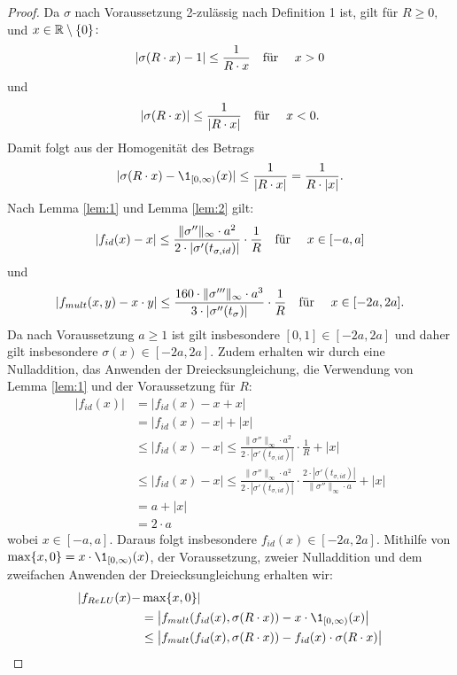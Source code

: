   \begin{proof}
  Da $\sigma$ nach Voraussetzung 2-zulässig nach Definition 1 ist, gilt für $R \geq 0,$ und $x \in \mathbb{R}\setminus\{0\}\colon$ $$|\sigma(R \cdot x) - 1| \leq \frac{1}{R\cdot x} \text{\quad für \quad} x > 0$$ und $$|\sigma(R \cdot x)| \leq \frac{1}{|R \cdot x|} \text{\quad für \quad} x < 0.$$
Damit folgt aus der Homogenität des Betrags $$|\sigma(R \cdot x) - \1_{[0, \infty)}(x)| \leq \frac{1}{|R \cdot x|} = \frac{1}{R \cdot |x|}.$$ 
Nach Lemma \ref{lem:1} und Lemma \ref{lem:2} gilt$\colon$
$$ |f_{id}(x) - x| \leq \frac{\|\sigma''\|_{\infty} \cdot a^2}{2 \cdot |\sigma'(t_{\sigma, id})|} \cdot \frac{1}{R} \text{\quad für \quad} x \in [-a, a]$$ und 
$$ |f_{mult}(x, y) - x \cdot y| \leq \frac{160 \cdot \|\sigma'''\|_{\infty} \cdot a ^3}{3 \cdot |\sigma''(t_{\sigma})|} \cdot \frac{1}{R} \text{\quad für \quad} x \in [-2a, 2a].$$ 
Da nach Voraussetzung $a \geq 1$ ist gilt insbesondere $[0, 1] \in [-2a, 2a]$ und daher gilt insbesondere $\sigma(x) \in [-2a, 2a].$ 
Zudem erhalten wir durch eine Nulladdition, das Anwenden der Dreiecksungleichung, die Verwendung von Lemma \ref{lem:1} und der Voraussetzung für $R\colon$
\begin{equation*}
\begin{split}
|f_{id}(x)| & = |f_{id}(x) - x + x| \\
& = |f_{id}(x) -x| + |x| \\
& \leq |f_{id}(x) - x| \leq \frac{\|\sigma''\|_{\infty} \cdot a^2}{2 \cdot |\sigma'(t_{\sigma, id})|} \cdot \frac{1}{R} + |x| \\
& \leq |f_{id}(x) - x| \leq \frac{\|\sigma''\|_{\infty} \cdot a^2}{2 \cdot |\sigma'(t_{\sigma, id})|} \cdot \frac{2 \cdot |\sigma'(t_{\sigma, id})|}{\|\sigma''\|_{\infty} \cdot a} + |x| \\
& = a + |x| \\
& = 2 \cdot a
\end{split}
\end{equation*}
wobei $x \in [-a, a]$. Daraus folgt insbesondere $f_{id}(x) \in [-2a, 2a].$
Mithilfe von $\max\{x, 0 \} = x \cdot \1_{[0, \infty)}(x)$, der Voraussetzung, zweier Nulladdition und dem zweifachen Anwenden der Dreiecksungleichung erhalten wir$\colon$
\begin{equation*}
\begin{split}
|f_{ReLU}(x) - & \max\{x, 0\}|  \\
& = \big| f_{mult}(f_{id}(x), \sigma(R \cdot x)) - x \cdot \1_{[0, \infty)}(x)\big| \\
& \leq \big| f_{mult}(f_{id}(x), \sigma(R \cdot x)) - f_{id}(x)\cdot\sigma(R \cdot x)\big| \\

\end{split}
\end{equation*}
\end{proof}
